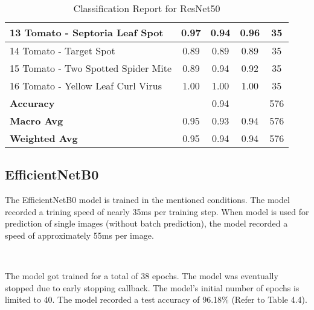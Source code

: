 \begin{table}[h!]
{\begin{tabular}{|l|c|c|c|c|}
    13 Tomato - Septoria Leaf Spot                    & 0.97               & 0.94            & 0.96              & 35               \\ \hline
    14 Tomato - Target Spot                           & 0.89               & 0.89            & 0.89              & 35               \\ \hline
    15 Tomato - Two Spotted Spider Mite               & 0.89               & 0.94            & 0.92              & 35               \\ \hline
    16 Tomato - Yellow Leaf Curl Virus                & 1.00               & 1.00            & 1.00              & 35               \\ \hline
    \textbf{Accuracy}                                 & \multicolumn{3}{c|}{0.94}            & 576              \\ \hline
    \textbf{Macro Avg}                                & 0.95               & 0.93            & 0.94              & 576              \\ \hline
    \textbf{Weighted Avg}                             & 0.95               & 0.94            & 0.94              & 576              \\ \hline
    \end{tabular}%
    }
    \caption{Classification Report for ResNet50}
    \label{tab:classification_report_rn50}
    \end{table}
    
\subsection{EfficientNetB0}

The EfficientNetB0 model is trained in the mentioned conditions. The model recorded a trining speed of nearly 35ms per training step. When model is used for prediction of single images (without batch prediction), the model recorded a speed of approximately 55ms per image. 

\

The model got trained for a total of 38 epochs. The model was eventually stopped due to early stopping callback. The model's initial number of epochs is limited to 40. The model recorded a test accuracy of 96.18\% (Refer to Table 4.4).

